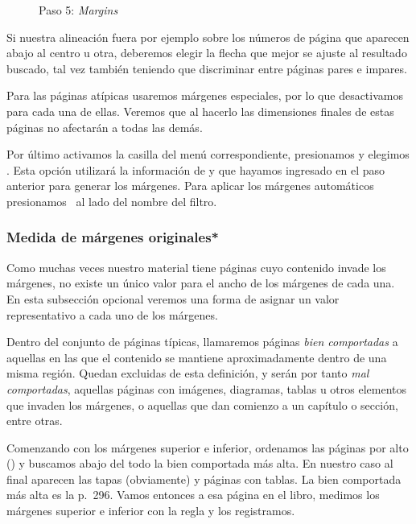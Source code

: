 \documentclass[%
	a5paper,
	10pt,
	twoside,
	openright,
	final,
]{memoir}
\begin{document}
	\begin{figure}
		\hfill
		\caption{Paso 5: \emph{Margins}\label{fig:STmargins}}
	\end{figure}

	Si nuestra alineación fuera por ejemplo sobre los números de página que aparecen abajo al centro u otra, deberemos elegir la flecha que mejor se ajuste al resultado buscado, tal vez también teniendo que discriminar entre páginas pares e impares.

	Para las páginas atípicas usaremos márgenes especiales, por lo que desactivamos  para cada una de ellas. Veremos que al hacerlo las dimensiones finales de estas páginas no afectarán a todas las demás.

	Por último activamos la casilla  del menú correspondiente, presionamos  y elegimos . Esta opción utilizará la información de  y  que hayamos ingresado en el paso anterior para generar los márgenes. Para aplicar los márgenes automáticos presionamos \play\ al lado del nombre del filtro.

	\subsubsection{Medida de márgenes originales*} Como muchas veces nuestro material tiene páginas cuyo contenido invade los márgenes, no existe un único valor para el ancho de los márgenes de cada una. En esta subsección opcional veremos una forma de asignar un valor representativo a cada uno de los márgenes.

	 Dentro del conjunto de páginas típicas, llamaremos páginas \emph{bien comportadas} a aquellas en las que el contenido se mantiene aproximadamente dentro de una misma región. Quedan excluidas de esta definición, y serán por tanto \emph{mal comportadas}, aquellas páginas con imágenes, diagramas, tablas u otros elementos que invaden los márgenes, o aquellas que dan comienzo a un capítulo o sección, entre otras.

	Comenzando con los márgenes superior e inferior, ordenamos las páginas por alto () y buscamos abajo del todo la bien comportada más alta. En nuestro caso al final aparecen las tapas (obviamente) y páginas con tablas. La bien comportada más alta es la p.~296. Vamos entonces a esa página en el libro, medimos los márgenes superior e inferior con la regla y los registramos.
\end{document}
